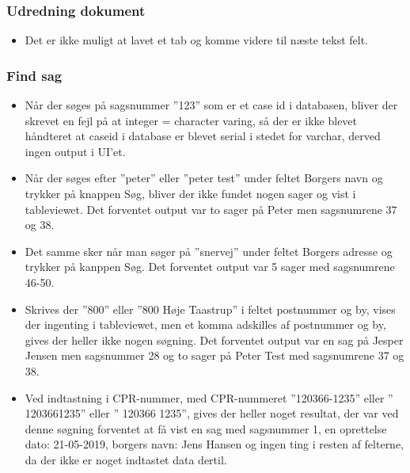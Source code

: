 \subsubsection{Udredning dokument}
\begin{itemize}
\item Det er ikke muligt at lavet et tab og komme videre til næste tekst felt.\end{itemize}
\subsubsection{Find sag}
\begin{itemize}
\item Når der søges på sagsnummer ”123” som er et case id i databasen, bliver der skrevet en fejl på at integer = character varing, så der er ikke blevet håndteret at caseid i database er blevet serial i stedet for varchar, derved ingen output i UI’et.
\item Når der søges efter ”peter” eller ”peter test” under feltet Borgers navn og trykker på knappen Søg, bliver der ikke fundet nogen sager og vist i tableviewet. Det forventet output var to sager på Peter men sagsnumrene 37 og 38.
\item Det samme sker når man søger på ”snervej” under feltet Borgers adresse og trykker på kanppen Søg. Det forventet output var 5 sager med sagsnumrene 46-50.
\item Skrives der ”800” eller ”800 Høje Taastrup” i feltet postnummer og by, vises der ingenting i tableviewet, men et komma adskilles af postnummer og by, gives der heller ikke nogen søgning. Det forventet output var en sag på Jesper Jensen men sagsnummer 28 og to sager på Peter Test med sagsnumrene 37 og 38.
\item Ved indtastning i CPR-nummer, med CPR-nummeret ”120366-1235” eller ” 1203661235” eller ” 120366 1235”, gives der heller noget resultat, der var ved denne søgning forventet at få vist en sag med sagsnummer 1, en oprettelse dato: 21-05-2019, borgers navn: Jens Hansen og ingen ting i resten af felterne, da der ikke er noget indtastet data dertil.
\end{itemize}
